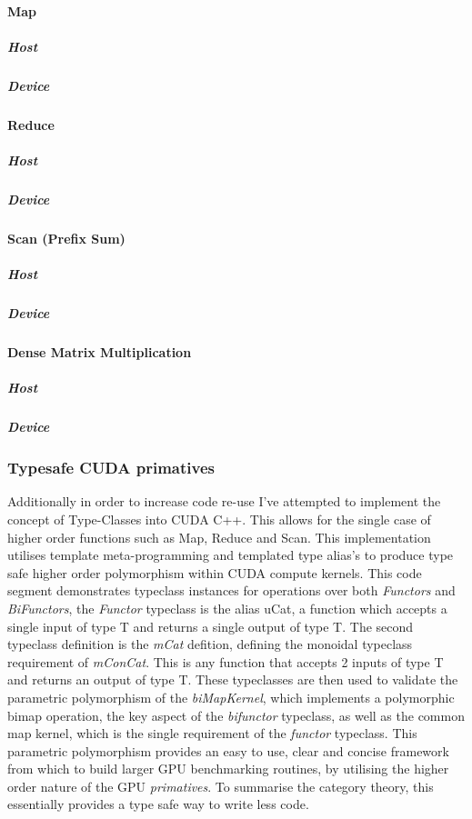 \paragraph{Map}
\subparagraph{Host}
\subparagraph{Device}

\paragraph{Reduce}
\subparagraph{Host}
\subparagraph{Device}

\paragraph{Scan (Prefix Sum)}
\subparagraph{Host}
\subparagraph{Device}

\paragraph{Dense Matrix Multiplication}
\subparagraph{Host}
\subparagraph{Device}


\subsubsection{Typesafe CUDA primatives}
Additionally in order to increase code re-use I've attempted to implement the concept of
Type-Classes into CUDA C++. This allows for the single case of higher order functions such as Map,
Reduce and Scan. This implementation utilises template meta-programming and templated type alias's
to produce type safe higher order polymorphism within CUDA compute kernels.
 This code segment demonstrates typeclass instances for
operations over both \textit{Functors} and \textit{BiFunctors}, the \textit{Functor} typeclass is
the alias uCat, a function which accepts a single input of type T and returns a single output of
type T. The second typeclass definition is the \textit{mCat} defition, defining the monoidal
typeclass requirement of \textit{mConCat}. This is any function that accepts 2 inputs of type T and
returns an output of type T. These typeclasses are then used to validate the parametric polymorphism
of the \textit{biMapKernel}, which implements a polymorphic bimap operation, the key aspect of the
\textit{bifunctor} typeclass, as well as the common map kernel, which is the single requirement of
the \textit{functor} typeclass. This parametric polymorphism provides an easy to use, clear and
concise framework from which to build larger GPU benchmarking routines, by utilising the higher
order nature of the GPU \textit{primatives}. To summarise the category theory, this essentially
provides a type safe way to write less code.
